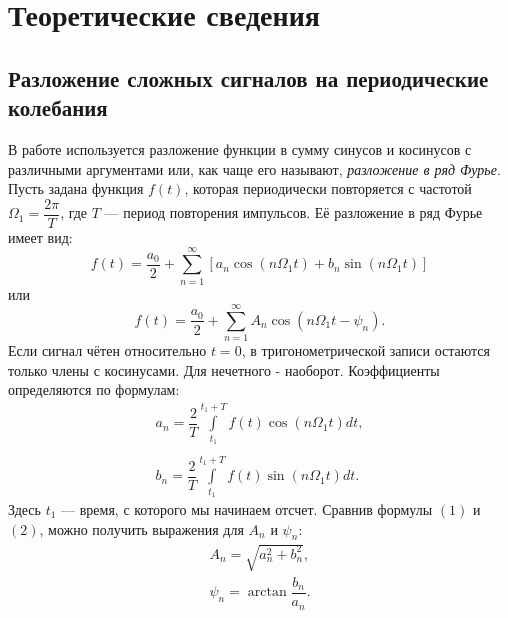 \section*{Теоретические сведения}

\subsection*{Разложение сложных сигналов на периодические колебания}
В работе используется разложение функции в сумму синусов и косинусов с различными аргументами или, как чаще его называют, \textit{разложение в ряд Фурье}.
\n\n
Пусть задана функция $f(t)$, которая периодически повторяется с частотой $\Omega_1 = \dfrac{2\pi}{T}$, где $T$ --- период повторения импульсов. Её разложение в ряд Фурье имеет вид: 
\begin{equation}
f(t) = \dfrac{a_0}{2} + \sum\limits_{n = 1}^{\infty}\left[a_n \cos \left(n \Omega_1t\right) + b_n \sin \left(n \Omega_1t\right)\right]
\end{equation}
или
\begin{equation}
f(t) = \dfrac{a_0}{2} + \sum\limits_{n = 1}^{\infty}A_n \cos \left(n\Omega_1t-\psi_n\right).
\end{equation}
Если сигнал чётен относительно $t=0$, в тригонометрической записи остаются только члены с косинусами. Для нечетного - наоборот.
\n\n
Коэффициенты определяются по формулам:
\begin{equation}
\begin{array}{c}
a_n  = \dfrac{2}{T}\int\limits_{t_1}^{t_1+T}f(t)\cos\left(n \Omega_1 t\right) dt,\\
\\
b_n = \dfrac{2}{T}\int\limits_{t_1}^{t_1+T}f(t)\sin\left(n \Omega_1 t\right) dt.
\end{array}
\end{equation}
Здесь $t_1$ --- время, с которого мы начинаем отсчет.
\n\n
Сравнив формулы $(1)$ и $(2)$, можно получить выражения для $A_n$  и $\psi_n$:
\begin{equation}
\begin{array}{l}
A_n = \sqrt{a_n^2+b_n^2},\\
 \psi_n = \arctan \dfrac{b_n}{a_n}.
\end{array}
\end{equation}
